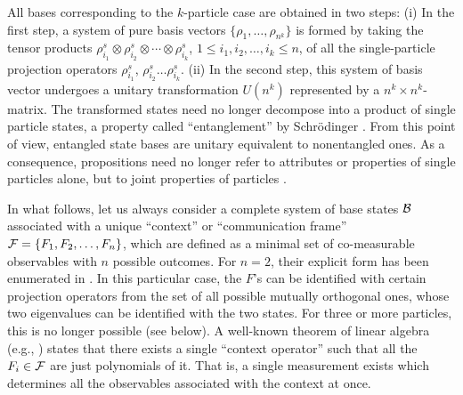 All bases corresponding to the $k$-particle case are obtained in two steps:
(i)
In the first step,
a system of pure basis vectors $\{\rho_1,\ldots ,\rho_{n^k}\}$
is formed by taking the tensor products
$\rho^s_{i_1}\otimes \rho^s_{i_2}\otimes \cdots \otimes\rho^s_{i_k}$,
$1\le i_1,i_2,\ldots ,i_k \le n$,
of all the single-particle
projection operators
$\rho^s_{i_1}$, $\rho^s_{i_2}\ldots \rho^s_{i_k}$.
(ii)
In the second step, this system of basis vector undergoes a unitary transformation
$U(n^k)$ represented by a $n^k \times n^k$-matrix.
The transformed states need no longer decompose into a product of single particle states,
a property called ``entanglement'' by Schr{\"{o}}dinger \cite{schrodinger}.
From this point of view,  entangled state bases are
unitary equivalent to nonentangled ones.
As a consequence,  propositions need no longer refer to attributes
or properties of single particles alone, but to joint properties of
particles \cite{zeil-99,DonSvo01}.

In what follows, let us always consider a complete
system of base states  ${\cal B}$ associated with a unique ``context'' \cite{svozil-2001-cesena}
or ``communication frame''
 ${\cal F}=\{F_1,F_2, \ldots ,F_{n} \}$, which are defined as a minimal set of
co-measurable observables with $n$ possible outcomes.
For $n=2$,
their explicit form has been enumerated in  \cite{DonSvo01}.
In this particular case, the $F$'s can be identified with certain projection
operators from the set of all possible mutually orthogonal ones,
whose two eigenvalues can be identified with the two states.
For three or more particles, this is no longer possible (see below).
A well-known theorem of linear algebra
(e.g.,
\cite{halmos-vs})
states that there exists a single ``context operator''
such that all the $F_i\in {\cal F}$ are just polynomials of it.
That is, a single measurement exists which determines
all the observables associated with the context
at once.





